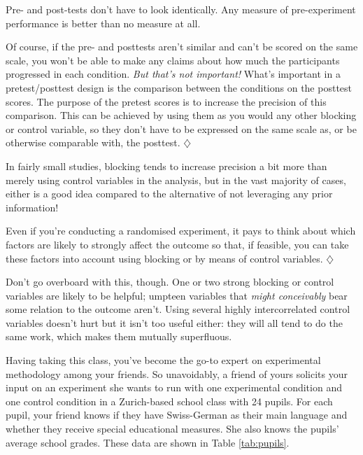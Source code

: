 \documentclass[a4paper]{tufte-book}\usepackage[]{graphicx}\usepackage[]{xcolor}
\newcommand*{\parend}[1][$\diamondsuit$]{%
  \unskip\nobreak\hspace{1em plus 1fill}$\diamondsuit$%
}
\begin{document}
 Pre- and post-tests don't have to look identically.
 Any measure of pre-experiment performance is better than no measure at all.


 Of course, if the pre- and posttests aren't similar and can't be scored
 on the same scale, you won't be able to make any claims about how much
 the participants progressed in each condition.
 \emph{But that's not important!}
 What's important in a pretest/posttest design is the comparison between
 the conditions on the posttest scores. The purpose of the pretest scores
 is to increase the precision of this comparison. This can be achieved
 by using them as you would any other blocking or control variable,
 so they don't have to be expressed on the same scale as,
 or be otherwise comparable with, the posttest.
\parend

In fairly small studies, blocking tends to increase precision a bit more than
merely using control variables in the analysis, but in the vast majority of
cases, either is a good idea compared to the alternative of not leveraging
any prior information!

 Even if you're conducting a randomised experiment, it pays to
 think about which factors are likely to strongly affect the outcome so that, if feasible, you
 can take these factors into account using blocking or by means of control variables.
\parend

Don't go overboard with this, though. One or two strong blocking or control
variables are likely to be helpful; umpteen variables that \emph{might conceivably}
bear some relation to the outcome aren't.
Using several highly intercorrelated control variables doesn't hurt but it 
isn't too useful either:
they will all tend to do the same work, 
which makes them mutually superfluous.

Having taking this class, you've become the go-to expert
  on experimental methodology among your friends. So unavoidably, a
  friend of yours solicits your input on an experiment she wants to run with
  one experimental condition and one control condition in a Zurich-based school class
  with 24 pupils.
  For each pupil, your friend knows if they have Swiss-German as their main
  language and whether they receive special educational measures.
  She also knows the pupils' average school grades.
  These data are shown in Table \vref{tab:pupils}.
\end{document}
